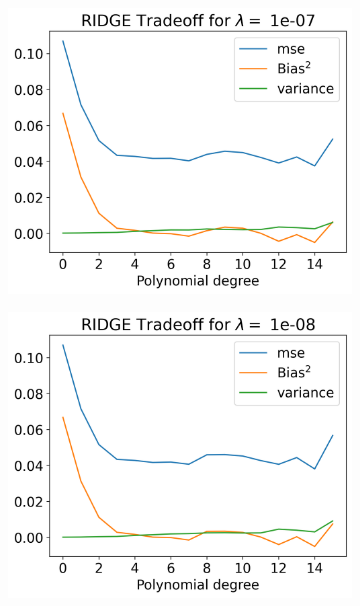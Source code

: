 \documentclass[12pt]{article}
\begin{document}
\begin{figure}[H]
  \begin{subfigure}{.5\textwidth}
    \centering
    \includegraphics[width=\textwidth]{../figures/tradeoff_RIDGE_1e-07.png}
    \caption{}
    \label{fig:l_1e-07}
  \end{subfigure}
  \begin{subfigure}{.5\textwidth}
    \centering
    \includegraphics[width=\textwidth]{../figures/tradeoff_RIDGE_1e-08.png}
    \caption{}
    \label{fig:l_1e-08}
  \end{subfigure}

\end{figure}
\end{document}
